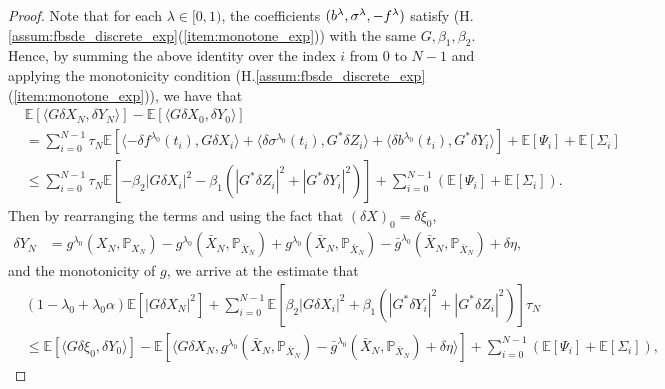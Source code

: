 \documentclass[11pt]{article}
\numberwithin{equation}{section}
\theoremstyle{definition}
\theoremstyle{remark}
\def\b{\beta}  \def\a{\alpha} \def\ga{\gamma}
\def \la{\langle} \def\ra{\rangle}
\def\sE{{\mathbb{E}}}
\def\sP{\mathbb{P}}
\begin{document}
\begin{proof}
Note that  for each $\lambda\in [0,1)$, the coefficients
  $(b^\lambda,\sigma^\lambda, -f^\lambda)$ 
  satisfy (H.\ref{assum:fbsde_discrete_exp}(\ref{item:monotone_exp})) 
  with the same $G,\b_1,\b_2$.
Hence, by summing the above identity over the index $i$ from $0$ to $N-1$
and  applying the monotonicity condition (H.\ref{assum:fbsde_discrete_exp}(\ref{item:monotone_exp})),
we have that
\begin{align*}
&\sE[ \la G\delta X_N, \delta Y_N\ra]
-\sE[ \la G\delta X_0, \delta Y_0\ra]
 \\
 & =
\sum_{i=0}^{N-1}
\tau_N
\sE[
\la -\delta f^{\lambda_0}(t_{i}),G\delta X_{i}\ra
 +\la \delta \sigma^{\lambda_0}(t_i), G^*\delta Z_i\ra
 +\la \delta b^{\lambda_0}(t_{i}),G^*\delta Y_{i} \ra
 ]
 +\sE[\Psi_i]
  +\sE[\Sigma_i]
 \\
  &\le
 \sum_{i=0}^{N-1}
  \tau_N
\sE[
-\beta_2|G\delta X_{i}|^2
-\beta_1(
|G^*\delta Z_i|^2+|G^*\delta Y_{i}|^2
)
 ]
 +\sum_{i=0}^{N-1}(\sE[\Psi_i]+\sE[\Sigma_i]).
\end{align*}
 Then by rearranging the terms
and using the fact that $(\delta X)_0=\delta \xi_0$,
\begin{align*}
\delta Y_N
&=g^{\lambda_0}(X_N,\sP_{X_N})-g^{\lambda_0}(\bar{X}_N,\sP_{\bar{X}_N})
+g^{\lambda_0}(\bar{X}_N,\sP_{\bar{X}_N})-\bar{g}^{\lambda_0}(\bar{X}_N,\sP_{\bar{X}_N})
+\delta \eta,
\end{align*}
 and the monotonicity of $g$,
we arrive at the estimate that
\begin{align*}
&
(1-\lambda_0+\lambda_0\a) \sE[
|G\delta X_{N}|^2]
+
 \sum_{i=0}^{N-1}
  \sE[
\beta_2|G\delta X_{i}|^2
+
\beta_1(
|G^*\delta Y_i|^2+|G^*\delta Z_{i}|^2
) ]\tau_N
 \\
& \le
\sE[ \la G\delta \xi_0, \delta Y_0\ra]
-\sE[ \la G\delta X_N, g^{\lambda_0}(\bar{X}_N,\sP_{\bar{X}_N})-\bar{g}^{\lambda_0}(\bar{X}_N,\sP_{\bar{X}_N})
+\delta \eta\ra]
 +\sum_{i=0}^{N-1}(\sE[\Psi_i]+\sE[\Sigma_i]),

\end{align*}
\end{proof}
\end{document}
